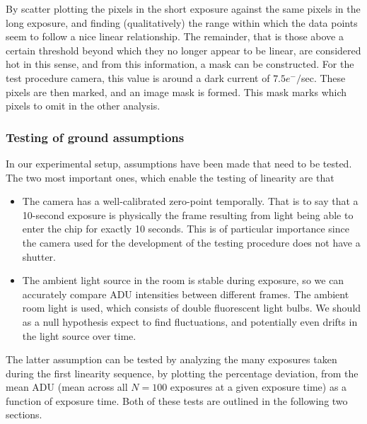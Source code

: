 \documentclass[../main.tex]{subfiles}
\begin{document}
		By scatter plotting the pixels in the short exposure against the same pixels in the long exposure, and finding (qualitatively) the range within which the data points seem to follow a nice linear relationship. The remainder, that is those above a certain threshold beyond which they no longer appear to be linear, are considered hot in this sense, and from this information, a mask can be constructed. For the test procedure camera, this value is around a dark current of $7.5 e^-/$sec. These pixels are then marked, and an image mask is formed. This mask marks which pixels to omit in the other analysis.
		
		\subsubsection{Testing of ground assumptions}
		In our experimental setup, assumptions have been made that need to be tested. The two most important ones, which enable the testing of linearity are that 
		\begin{itemize}
			\item The camera has a well-calibrated zero-point temporally. That is to say that a 10-second exposure is physically the frame resulting from light being able to enter the chip for exactly 10 seconds. This is of particular importance since the camera used for the development of the testing procedure does not have a shutter.
			\item The ambient light source in the room is stable during exposure, so we can accurately compare ADU intensities between different frames. The ambient room light is used, which consists of double fluorescent light bulbs. We should as a null hypothesis expect to find fluctuations, and potentially even drifts in the light source over time.
		\end{itemize}
		The latter assumption can be tested by analyzing the many exposures taken during the first linearity sequence, by plotting the percentage deviation, from the mean ADU (mean across all $N=100$ exposures at a given exposure time) as a function of exposure time. Both of these tests are outlined in the following two sections. 
		
\end{document}

